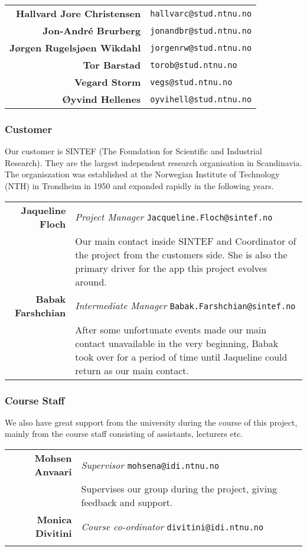 \begin{tabular}{r|p{11cm}}
\textbf{Hallvard Jore Christensen} & \texttt{hallvarc@stud.ntnu.no}\\[6pt]
\textbf{Jon-André Brurberg} & \texttt{jonandbr@stud.ntnu.no}\\[6pt]
\textbf{Jørgen Rugelsjøen Wikdahl} & \texttt{jorgenrw@stud.ntnu.no}\\[6pt]
\textbf{Tor Barstad} & \texttt{torob@stud.ntnu.no}\\[6pt]
\textbf{Vegard Storm} & \texttt{vegs@stud.ntnu.no}\\[6pt]
\textbf{Øyvind Hellenes} & \texttt{oyvihell@stud.ntnu.no}\\
\end{tabular}

\subsubsection{Customer}
Our customer is SINTEF (The Foundation for Scientific and Industrial Research). They are the largest independent research organisation in Scandinavia. The organiszation was established at the Norwegian Institute of Technology (NTH) in Trondheim in 1950 and expanded rapidly in the following years.

\begin{tabular}{r|p{11cm}}
\textbf{Jaqueline Floch} & \emph{Project Manager}   \texttt{Jacqueline.Floch@sintef.no}\\[4pt]
& Our main contact inside SINTEF and Coordinator of the project from the customers side. She is also the primary driver for the app this project evolves around. \\[8pt]
\textbf{Babak Farshchian} & \emph{Intermediate Manager}   \texttt{Babak.Farshchian@sintef.no}\\[4pt]
& After some unfortunate events made our main contact unavailable in the very beginning, Babak took over for a period of time until Jaqueline could return as our main contact. \\
\end{tabular}

\subsubsection{Course Staff}
We also have great support from the university during the course of this project, mainly from the course staff consisting of assistants, lecturers etc.

\begin{tabular}{r|p{11cm}}
\textbf{Mohsen Anvaari} & \emph{Supervisor}   \texttt{mohsena@idi.ntnu.no}\\[6pt]
& Supervises our group during the project, giving feedback and support. \\[8pt]
\textbf{Monica Divitini} & \emph{Course co-ordinator}   \texttt{divitini@idi.ntnu.no}\\[6pt]
& \todo{?}\\
\end{tabular}

